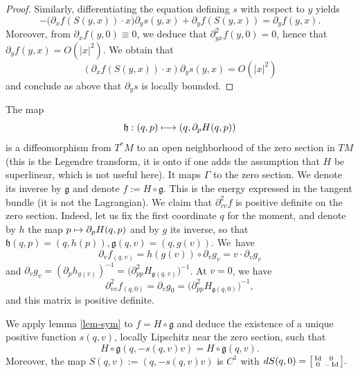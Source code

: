 \documentclass[10pt]{amsart}
\newcommand\mto{\mathchoice{\longmapsto}{\mapsto}{\mapsto}{\mapsto}}
\newenvironment{smallbmatrix}{\big[\begin{smallmatrix}}{\end{smallmatrix}\big]}
\DeclareMathOperator{\Id}{Id}
\theoremstyle{plain}
\theoremstyle{definition}
\begin{document}
\begin{proof}
Similarly, differentiating the equation defining $s$ with respect to $y$ yields
\[
-\big(\partial_xf(S(y,x))\cdot x \big) \partial_y s(y,x)+ \partial_y f(S(y,x))=\partial_y f(y,x).
\]
Moreover, from $\partial_xf(y,0)\equiv 0$, we deduce that $\partial^2_{yx}f (y,0)=0$, hence that
$\partial_yf(y,x)= O(|x|^2)$.
We obtain that
\[
(\partial_xf({S(y,x)})\cdot x ) \partial_y s(y,x)=O(|x|^2)
\]
and conclude as above that $\partial_y s$ is locally bounded.
\end{proof}

The map
\[
\mathfrak{h}: (q,p)\mto (q, \partial_pH(q,p))
\]
is a diffeomorphism from $T^*M$ to an open neighborhood of the zero section in $TM$ (this is the Legendre transform, it is onto if one adds the assumption that $H$ be superlinear, which is not useful here).
It maps $\Gamma$ to the zero section. We denote its inverse by
$
\mathfrak{g}
$ and denote $f:= H\circ \mathfrak{g}$. This is the energy expressed in the tangent bundle
(it is not the Lagrangian).
We claim that $\partial^2_{vv}f$ is positive definite on the zero section.
Indeed, let us fix the first coordinate $q$ for the moment, and denote by $h$ the map $p\mto \partial_pH(q,p)$ and by $g$ its inverse, so that $\mathfrak{h}(q,p)=(q,h(p)),\mathfrak{g}(q,v)=(q,g(v))$.
We~have
\[
\partial_vf_{(q,v)}=
h(g(v))\circ \partial_vg_v
=v\cdot \partial_vg_v
\]
and $\partial_vg_v= (\partial_ph_{g(v)})^{-1}=\big(\partial^2_{pp}H_{\mathfrak{g}(q,v)}\big)^{-1}$.
At $v=0$, we have
\[
\partial^2_{vv}f_{(q,0)}=\partial_vg_0=\big(\partial^2_{pp}H_{\mathfrak{g}(q,0)}\big)^{-1},
\]
and this matrix is positive definite.

We apply lemma \ref{lem-sym} to $f=H\circ \mathfrak{g}$ and deduce the existence of a unique positive function $s(q,v)$,
locally Lipschitz near the zero section, such that
\[
H\circ \mathfrak{g} (q, -s(q,v)v)=H\circ \mathfrak{g}(q, v).
\]
Moreover, the map $S(q,v):= (q, -s(q,v)v)$ is $C^1$ with
$dS(q,0)=
\begin{smallbmatrix}
\Id&0\\0&-\Id
\end{smallbmatrix}.$
\end{document}
